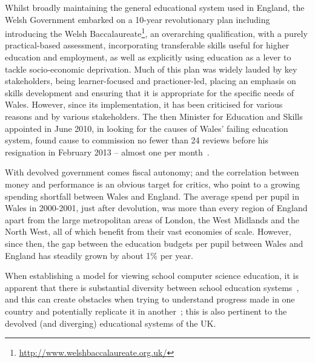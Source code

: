 \documentclass{llncs}
\begin{document}
Whilst broadly maintaining the general educational system used in
England, the Welsh Government embarked on a 10-year revolutionary plan
including introducing the Welsh
Baccalaureate\footnote{\url{http://www.welshbaccalaureate.org.uk/}},
an overarching qualification, with a purely practical-based
assessment, incorporating transferable skills useful for higher
education and employment, as well as explicitly using education as a
lever to tackle socio-economic deprivation. Much of this plan was
widely lauded by key stakeholders, being learner-focused and
practioner-led, placing an emphasis on skills development and ensuring
that it is appropriate for the specific needs of Wales. However, since
its implementation, it has been criticised for various reasons and by
various stakeholders.  The then Minister for Education and Skills
appointed in June 2010, in looking for the causes of Wales' failing
education system, found cause to commission no fewer than 24 reviews
before his resignation in February 2013 -- almost one per
month~\cite{Evans:2015}.

With devolved government comes fiscal autonomy; and the
correlation between money and performance is an obvious target for
critics, who point to a growing spending shortfall between Wales and
England.  The average spend per pupil in Wales in 2000-2001, just
after devolution, was more than every region of England apart from
the large metropolitan areas of London, the West Midlands and the
North West, all of which benefit from their vast economies of scale.
However, since then, the gap between the education budgets per pupil
between Wales and England has steadily grown by about 1\% per year.

When establishing a model for viewing school computer science
education, it is apparent that there is substantial diversity between
school education systems~\cite{snyder:2012}, and this can create
obstacles when trying to understand progress made in one country and
potentially replicate it in another~\cite{hubwieser-et-al:2015}; this
is also pertinent to the devolved (and diverging) educational systems
of the UK.

\end{document}

